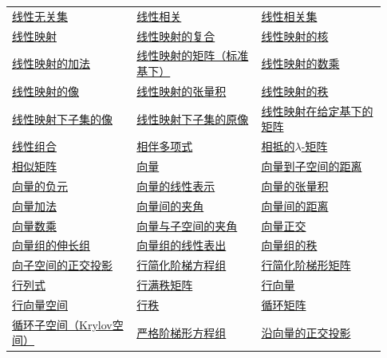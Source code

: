 \begin{longtable}{@{}>{\raggedright\arraybackslash}p{0.31\linewidth}>{\raggedright\arraybackslash}p{0.31\linewidth}>{\raggedright\arraybackslash}p{0.31\linewidth}@{}}
\hyperref[p1:concept:c4-l173]{线性无关集} & \hyperref[p1:concept:c2-l270]{线性相关} & \hyperref[p1:concept:c4-l173]{线性相关集}\\
\hyperref[p1:concept:c4-l1349]{线性映射} & \hyperref[p1:concept:c3-l328]{线性映射的复合} & \hyperref[p1:concept:c3-l209]{线性映射的核}\\
\hyperref[p1:concept:c3-l300]{线性映射的加法} & \hyperref[p1:concept:c3-l77]{线性映射的矩阵（标准基下）} & \hyperref[p1:concept:c3-l300]{线性映射的数乘}\\
\hyperref[p1:concept:c3-l248]{线性映射的像} & \hyperref[p1:concept:c7-l2824]{线性映射的张量积} & \hyperref[p1:concept:c4-l2617]{线性映射的秩}\\
\hyperref[p1:concept:c4-l1397]{线性映射下子集的像} & \hyperref[p1:concept:c4-l1391]{线性映射下子集的原像} & \hyperref[p1:concept:c4-l2360]{线性映射在给定基下的矩阵}\\
\hyperref[p1:concept:c4-l104]{线性组合} & \hyperref[p1:concept:c1-l558]{相伴多项式} & \hyperref[p1:concept:c5-l2001]{相抵的$\lambda$-矩阵}\\
\hyperref[p1:concept:c5-l820]{相似矩阵} & \hyperref[p1:concept:c2-l222]{向量} & \hyperref[p1:concept:c6-l3040]{向量到子空间的距离}\\
\hyperref[p1:concept:c4-l7]{向量的负元} & \hyperref[p1:concept:c2-l270]{向量的线性表示} & \hyperref[p1:concept:c7-l2632]{向量的张量积}\\
\hyperref[p1:concept:c4-l7]{向量加法} & \hyperref[p1:concept:c6-l157]{向量间的夹角} & \hyperref[p1:concept:c6-l101]{向量间的距离}\\
\hyperref[p1:concept:c4-l7]{向量数乘} & \hyperref[p1:concept:c6-l3075]{向量与子空间的夹角} & \hyperref[p1:concept:c6-l101]{向量正交}\\
\hyperref[p1:concept:c2-l383]{向量组的伸长组} & \hyperref[p1:concept:c2-l528]{向量组的线性表出} & \hyperref[p1:concept:c2-l548]{向量组的秩}\\
\hyperref[p1:concept:c6-l386]{向子空间的正交投影} & \hyperref[p1:concept:c2-l206]{行简化阶梯方程组} & \hyperref[p1:concept:c2-l873]{行简化阶梯形矩阵}\\
\hyperref[p1:concept:c3-l1908]{行列式} & \hyperref[p1:concept:c3-l263]{行满秩矩阵} & \hyperref[p1:concept:c2-l222]{行向量}\\
\hyperref[p1:concept:c2-l222]{行向量空间} & \hyperref[p1:concept:c2-l739]{行秩} & \hyperref[p1:concept:c5-l3660]{循环矩阵}\\
\hyperref[p1:concept:c5-l59]{循环子空间（Krylov空间）} & \hyperref[p1:concept:c2-l61]{严格阶梯形方程组} & \hyperref[p1:concept:c6-l245]{沿向量的正交投影}\\

\end{longtable}
